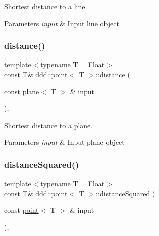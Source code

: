 Shortest distance to a line. 


\begin{DoxyParams}{Parameters}
{\em input} & Input line object \\
\hline
\end{DoxyParams}
\mbox{\label{classddd_1_1point_a1080466b104b23a1b041f6049aaed15d}} 
\subsubsection{\texorpdfstring{distance()}{distance()}\hspace{0.1cm}{\footnotesize\ttfamily [3/3]}}
{\footnotesize\ttfamily template$<$typename T = Float$>$ \\
const T\& \hyperlink{classddd_1_1point}{ddd\+::point}$<$ T $>$\+::distance (\begin{DoxyParamCaption}\item[{const \hyperlink{classddd_1_1plane}{plane}$<$ T $>$ \&}]{input }\end{DoxyParamCaption})\hspace{0.3cm}{\ttfamily [inline]}, {\ttfamily [inherited]}}



Shortest distance to a plane. 


\begin{DoxyParams}{Parameters}
{\em input} & Input plane object \\
\hline
\end{DoxyParams}
\mbox{\label{classddd_1_1point_a58ef7bc4870110dfd05c00609357756c}} 
\subsubsection{\texorpdfstring{distance\+Squared()}{distanceSquared()}}
{\footnotesize\ttfamily template$<$typename T = Float$>$ \\
const T\& \hyperlink{classddd_1_1point}{ddd\+::point}$<$ T $>$\+::distance\+Squared (\begin{DoxyParamCaption}\item[{const \hyperlink{classddd_1_1point}{point}$<$ T $>$ \&}]{input }\end{DoxyParamCaption})\hspace{0.3cm}{\ttfamily [inline]}, {\ttfamily [inherited]}}



